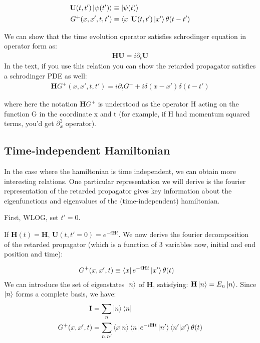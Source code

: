 \documentclass[11pt]{article}
\theoremstyle{definition}
\begin{document}
\begin{align}
\mathbf{U} (t, t') \ket{\psi(t')} &\equiv \ket{\psi(t)} \\
G^+(x, x', t, t') &\equiv \bra{x} \mathbf{U}(t, t') \ket{x'} \theta(t - t')
\end{align}

We can show that the time evolution operator satisfies schrodinger equation in operator form as:
\begin{align}
\mathbf{H U} = i \partial_t \mathbf{U}
\end{align}
In the text, if you use this relation you can show the retarded propagator satisfies a schrodinger PDE as well:
\begin{align}
\mathbf{H} G^+(x, x', t, t') = i \partial_t G^+ + i \delta(x - x') \delta(t - t')
\end{align}

where here the notation $\mathbf{H} G^+$ is understood as the operator H acting on the function G in the coordinate x and t (for example, if H had momentum squared terms, you'd get $\partial_x^2$ operator).

\subsection{Time-independent Hamiltonian}

In the case where the hamiltonian is time independent, we can obtain more interesting relations.  One particular representation we will derive is the fourier representation of the retarded propagator gives key information about the eigenfunctions and eigenvalues of the (time-independent) hamiltonian.

First, WLOG, set $t' = 0$.

If $\mathbf{H}(t) = \mathbf{H}$, $\mathbf{U}(t, t' = 0) = e^{-i \mathbf{H} t}$.
We now derive the fourier decomposition of the retarded propagator (which is a function of 3 variables now, initial and end position and time):

\begin{align}
G^+(x, x', t) &\equiv \bra{x} e^{-i \mathbf{H}t} \ket{x'}  \theta(t) 
\end{align}
We can introduce the set of eigenstates $\ket{n}$ of $\mathbf{H}$, satisfying: $\mathbf{H}\ket{n} = E_n \ket{n}$.  Since $\ket{n}$ forms a complete basis, we have:
\begin{align}
 \mathbf{I} & = \sum_n \ket{n} \bra{n} \\
G^{+} (x, x', t)& = \sum_{n, n'} \braket{x | n} \bra{n}e^{-i \mathbf{H}t} \ket{n'} \braket{n' | x'} \theta(t) \\
\end{align}
\end{document}
